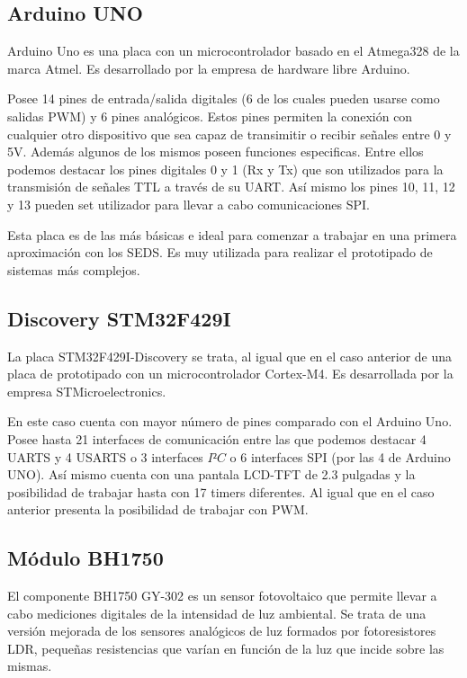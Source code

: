 \subsection{Arduino UNO}\label{subsec:arduino}
Arduino Uno es una placa con un microcontrolador basado en el
Atmega328 de la marca Atmel. Es desarrollado por la empresa de
hardware libre Arduino.

 Posee 14 pines de entrada/salida digitales (6 de los cuales
pueden usarse como salidas PWM) y 6 pines anal\'ogicos. Estos pines
permiten la conexi\'on con cualquier otro dispositivo que sea capaz de
transimitir o recibir señales entre 0 y 5V. Adem\'as algunos de los
mismos poseen funciones especificas. Entre ellos podemos destacar 
los pines digitales 0 y 1 (Rx y Tx) que son utilizados para la transmisi\'on de
señales TTL a trav\'es de su UART. As\'i mismo los pines 10, 11, 12 y
13 pueden set utilizador para llevar a cabo comunicaciones SPI.

Esta placa es de las m\'as b\'asicas e ideal para comenzar a trabajar
en una primera aproximaci\'on con los SEDS. Es muy utilizada para
realizar el prototipado de sistemas m\'as complejos.

\subsection{Discovery STM32F429I}\label{subsec:discovery}

La placa STM32F429I-Discovery se trata, al igual que en el caso
anterior de una placa de prototipado con un microcontrolador
Cortex-M4. Es desarrollada por la empresa STMicroelectronics. 

En este
caso cuenta con mayor n\'umero de pines comparado con el Arduino
Uno. Posee hasta 21 interfaces de comunicaci\'on entre las que podemos
destacar 4 UARTS y 4 USARTS o 3 interfaces $I²C$ o 6 interfaces SPI
(por las 4 de Arduino UNO). As\'i mismo cuenta
con una pantala LCD-TFT de 2.3 pulgadas y la posibilidad de trabajar
hasta con 17 timers diferentes. Al igual que en el caso anterior
presenta la posibilidad de trabajar con PWM.

\subsection{M\'odulo BH1750}\label{subsec:bh1750}
El componente BH1750 GY-302 es un sensor fotovoltaico que permite
llevar a cabo mediciones digitales de la intensidad de luz
ambiental. Se trata de una versi\'on mejorada de los sensores
anal\'ogicos de luz formados por fotoresistores LDR, peque\~nas resistencias que
var\'ian en funci\'on de la luz que incide sobre las mismas.

